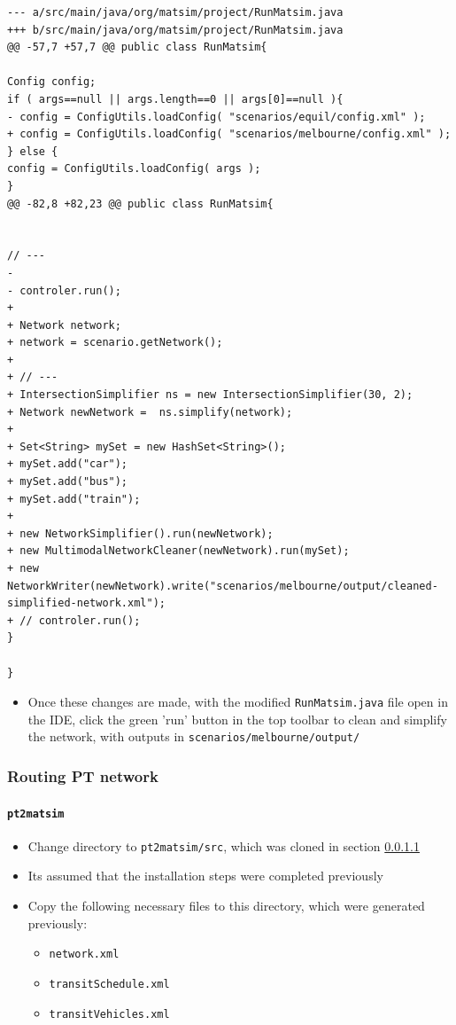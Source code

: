 \documentclass[11pt]{article}
\begin{document}
\begin{verbatim}
--- a/src/main/java/org/matsim/project/RunMatsim.java
+++ b/src/main/java/org/matsim/project/RunMatsim.java
@@ -57,7 +57,7 @@ public class RunMatsim{

Config config;
if ( args==null || args.length==0 || args[0]==null ){
- config = ConfigUtils.loadConfig( "scenarios/equil/config.xml" );
+ config = ConfigUtils.loadConfig( "scenarios/melbourne/config.xml" );
} else {
config = ConfigUtils.loadConfig( args );
}
@@ -82,8 +82,23 @@ public class RunMatsim{


// ---
-
- controler.run();
+
+ Network network;
+ network = scenario.getNetwork();
+
+ // ---
+ IntersectionSimplifier ns = new IntersectionSimplifier(30, 2);
+ Network newNetwork =  ns.simplify(network);
+
+ Set<String> mySet = new HashSet<String>();
+ mySet.add("car");
+ mySet.add("bus");
+ mySet.add("train");
+
+ new NetworkSimplifier().run(newNetwork);
+ new MultimodalNetworkCleaner(newNetwork).run(mySet);
+ new NetworkWriter(newNetwork).write("scenarios/melbourne/output/cleaned-simplified-network.xml");
+ // controler.run();
}

}
\end{verbatim}

\begin{itemize}
\item Once these changes are made, with the modified \texttt{RunMatsim.java} file open in the IDE, click the green 'run' button in the top toolbar to clean and simplify the network, with outputs in \texttt{scenarios/melbourne/output/}
\end{itemize}
\subsubsection{Routing PT network}
\label{sec:org486daf1}
\paragraph{\texttt{pt2matsim}}
\label{sec:org3a355d7}
\begin{itemize}
\item Change directory to \texttt{pt2matsim/src}, which was cloned in section \ref{sec:org3a355d7}
\item Its assumed that the installation steps were completed previously
\end{itemize}

\begin{itemize}
\item Copy the following necessary files to this directory, which were generated previously:
\begin{itemize}
\item \texttt{network.xml}
\item \texttt{transitSchedule.xml}
\item \texttt{transitVehicles.xml}
\end{itemize}
\end{itemize}
\end{document}
